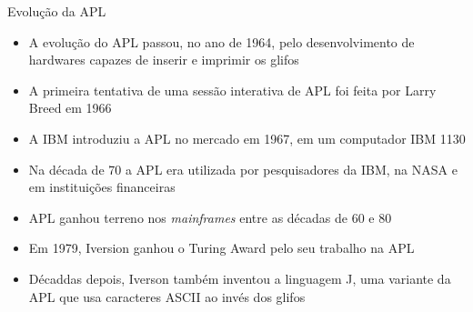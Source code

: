 \begin{frame}[fragile]{Evolução da APL}

    \begin{itemize}
        \item A evolução do APL passou, no ano de 1964, pelo desenvolvimento de hardwares capazes de inserir e imprimir os glifos
        \pause

        \item A primeira tentativa de uma sessão interativa de APL foi feita por Larry Breed em 1966
        \pause

        \item A IBM introduziu a APL no mercado em 1967, em um computador IBM 1130
        \pause

        \item Na década de 70 a APL era utilizada por pesquisadores da IBM, na NASA e em instituições financeiras
        \pause

        \item APL ganhou terreno nos \textit{mainframes} entre as décadas de 60 e 80
        \pause

        \item Em 1979, Iversion ganhou o Turing Award pelo seu trabalho na APL
        \pause

        \item Décaddas depois, Iverson também inventou a linguagem J, uma variante da APL que usa caracteres ASCII ao invés dos glifos
    \end{itemize}

\end{frame}

